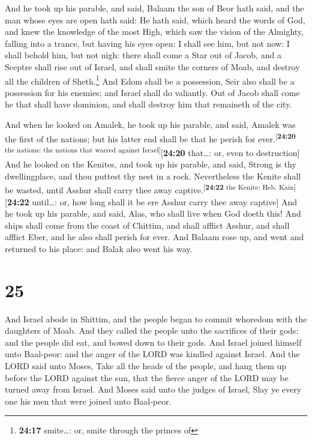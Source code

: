  And he took up his parable, and said, Balaam the son of
Beor hath said, and the man whose eyes are open hath said:
 He hath said, which heard the words of God, and knew the
knowledge of the most High, which saw the vision of the Almighty,
falling into a trance, but having his eyes open:  I shall
see him, but not now: I shall behold him, but not nigh: there shall come
a Star out of Jacob, and a Sceptre shall rise out of Israel, and shall
smite the corners of Moab, and destroy all the children of
Sheth.\footnote{\textbf{24:17} smite\ldots: or, smite through the
  princes of}  And Edom shall be a possession, Seir also
shall be a possession for his enemies; and Israel shall do valiantly.
 Out of Jacob shall come he that shall have dominion, and
shall destroy him that remaineth of the city.

 And when he looked on Amalek, he took up his parable,
and said, Amalek was the first of the nations; but his latter end shall
be that he perish for ever.\textsuperscript{{[}\textbf{24:20} the
nations: the nations that warred against Israel{]}}{[}\textbf{24:20}
that\ldots: or, even to destruction{]}  And he looked on
the Kenites, and took up his parable, and said, Strong is thy
dwellingplace, and thou puttest thy nest in a rock. 
Nevertheless the Kenite shall be wasted, until Asshur shall carry thee
away captive.\textsuperscript{{[}\textbf{24:22} the Kenite: Heb.
Kain{]}}{[}\textbf{24:22} until\ldots: or, how long shall it be ere
Asshur carry thee away captive{]}  And he took up his
parable, and said, Alas, who shall live when God doeth this!
 And ships shall come from the coast of Chittim, and
shall afflict Asshur, and shall afflict Eber, and he also shall perish
for ever.  And Balaam rose up, and went and returned to
his place: and Balak also went his way.

\hypertarget{section-24}{%
\section{25}\label{section-24}}

 And Israel abode in Shittim, and the people began to
commit whoredom with the daughters of Moab.  And they
called the people unto the sacrifices of their gods: and the people did
eat, and bowed down to their gods.  And Israel joined
himself unto Baal-peor: and the anger of the LORD was kindled against
Israel.  And the LORD said unto Moses, Take all the heads
of the people, and hang them up before the LORD against the sun, that
the fierce anger of the LORD may be turned away from Israel.
 And Moses said unto the judges of Israel, Slay ye every
one his men that were joined unto Baal-peor.

